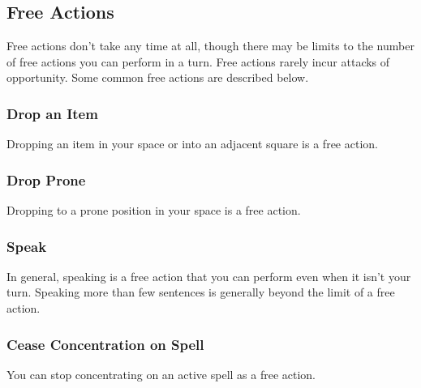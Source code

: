 
\subsection{Free Actions}
Free actions don't take any time at all, though there may be limits to the number of free actions you can perform in a turn. Free actions rarely incur attacks of opportunity. Some common free actions are described below.

\subsubsection{Drop an Item}
Dropping an item in your space or into an adjacent square is a free action.

\subsubsection{Drop Prone}
Dropping to a prone position in your space is a free action.

\subsubsection{Speak}
In general, speaking is a free action that you can perform even when it isn't your turn. Speaking more than few sentences is generally beyond the limit of a free action.

\subsubsection{Cease Concentration on Spell}
You can stop concentrating on an active spell as a free action.

